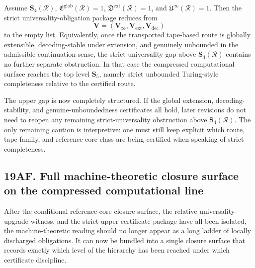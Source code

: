 \begin{proposition}
Assume \(\mathbf S_4(\mathcal R)\), \(\mathfrak E^{\mathrm{glob}}(\mathcal R)=1\), \(\mathfrak D^{\mathrm{ext}}(\mathcal R)=1\), and \(\mathfrak U^{\infty}(\mathcal R)=1\). Then the strict universality-obligation package reduces from
\[
\mathbf V=(\mathbf V_\infty,\mathbf V_{\mathrm{ext}},\mathbf V_{\mathrm{dec}})
\]
to the empty list.
Equivalently, once the transported tape-based route is globally extensible, decoding-stable under extension, and genuinely unbounded in the admissible continuation sense, the strict universality gap above \(\mathbf S_4(\mathcal R)\) contains no further separate obstruction. In that case the compressed computational surface reaches the top level \(\mathbf S_5\), namely strict unbounded Turing-style completeness relative to the certified route.
\end{proposition}

\begin{corollary}
The upper gap is now completely structured. If the global extension, decoding-stability, and genuine-unboundedness certificates all hold, later revisions do not need to reopen any remaining strict-universality obstruction above \(\mathbf S_4(\mathcal R)\). The only remaining caution is interpretive: one must still keep explicit which route, tape-family, and reference-core class are being certified when speaking of strict completeness.
\end{corollary}


\subsection*{19AF. Full machine-theoretic closure surface on the compressed computational line}
After the conditional reference-core closure surface, the relative universality-upgrade witness, and the strict upper certificate package have all been isolated, the machine-theoretic reading should no longer appear as a long ladder of locally discharged obligations. It can now be bundled into a single closure surface that records exactly which level of the hierarchy has been reached under which certificate discipline.

